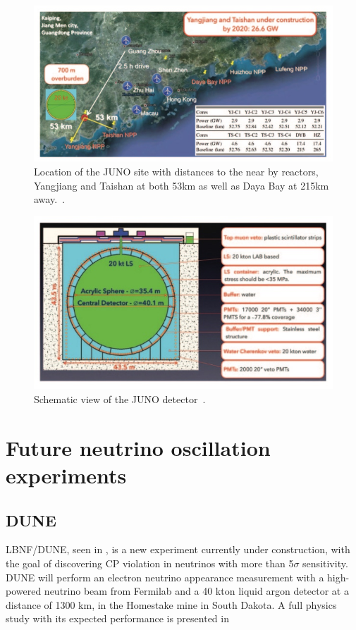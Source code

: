 \begin{figure}[h!]
  \centering
    \includegraphics[width=\textwidth]{figures/juno1.jpeg}
    \vspace{2mm}
    \caption{Location of the JUNO site with distances to the near by reactors, Yangjiang and Taishan at both 53km as well as Daya Bay at 215km away.~\cite{75Juno}.}
    \label{fig:juno1}
  \end{figure}
  \begin{figure}[h!]

    \includegraphics[width=\textwidth]{figures/juno2.jpeg}
       \vspace{2mm}
    \caption{Schematic view of the JUNO detector~\cite{75Juno}.}
     \label{fig:juno2}
\end{figure}

\FloatBarrier
\section{Future neutrino oscillation experiments}

\subsection{DUNE}
LBNF/DUNE\cite{23DUNE}, seen in , is a new experiment currently under construction, with the goal of discovering CP violation in neutrinos with more than 5$\sigma$ sensitivity. DUNE will perform an electron neutrino appearance measurement with a high-powered neutrino beam from Fermilab and a 40 kton liquid argon detector at a distance of 1300 km, in the Homestake mine in South Dakota. A full physics study with its expected performance is presented in~\cite{76Dune}

